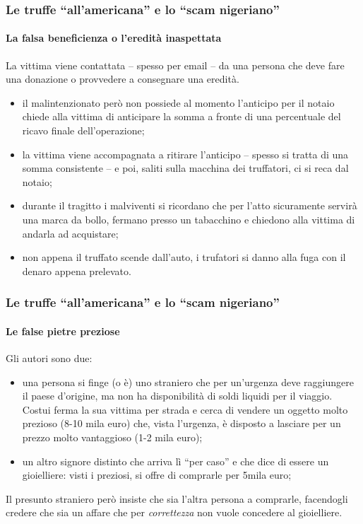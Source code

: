 \documentclass[11pt]{beamer}
\begin{document}
	\begin{frame}
		\frametitle{Le truffe ``all'americana'' e lo ``scam nigeriano''}
		\framesubtitle{La falsa beneficienza o l'eredità inaspettata}
		La vittima viene contattata -- spesso per email -- da una persona che deve fare una donazione o provvedere a consegnare una eredità. 
		\begin{itemize}
			\item il malintenzionato però non possiede al momento l'anticipo per il notaio chiede alla vittima di anticipare la somma a fronte di una percentuale del ricavo finale dell'operazione;
			\item la vittima viene accompagnata a ritirare l'anticipo -- spesso si tratta di una somma consistente -- e poi, saliti sulla macchina dei truffatori, ci si reca dal notaio;
			\item durante il tragitto i malviventi si ricordano che per l'atto sicuramente servirà una marca da bollo, fermano presso un tabacchino e chiedono alla vittima di andarla ad acquistare;
			\item non appena il truffato scende dall'auto, i trufatori si danno alla fuga con il denaro appena prelevato.
		\end{itemize}

		
	\end{frame}
	\begin{frame}
		\frametitle{Le truffe ``all'americana'' e lo ``scam nigeriano''}
		\framesubtitle{Le false pietre preziose}
		Gli autori sono due: 
		\begin{itemize}
			\item una persona si finge (o è) uno straniero che per un'urgenza deve raggiungere il paese d'origine, ma non ha disponibilità di soldi liquidi per il viaggio. 	Costui ferma la sua vittima per strada e cerca di vendere un oggetto molto prezioso (8-10 mila euro) che, vista l'urgenza, è disposto a lasciare per un prezzo molto vantaggioso (1-2 mila euro);
			\item  un altro signore distinto che arriva lì ``per caso'' e che dice di essere un gioielliere: visti i preziosi, si offre di comprarle per 5mila euro;
		\end{itemize}
	
		
		
		Il presunto straniero però insiste che sia l'altra persona a comprarle, facendogli credere che sia un affare che per \textit{correttezza} non vuole concedere al gioielliere.
		
		
	\end{frame}
\end{document}
